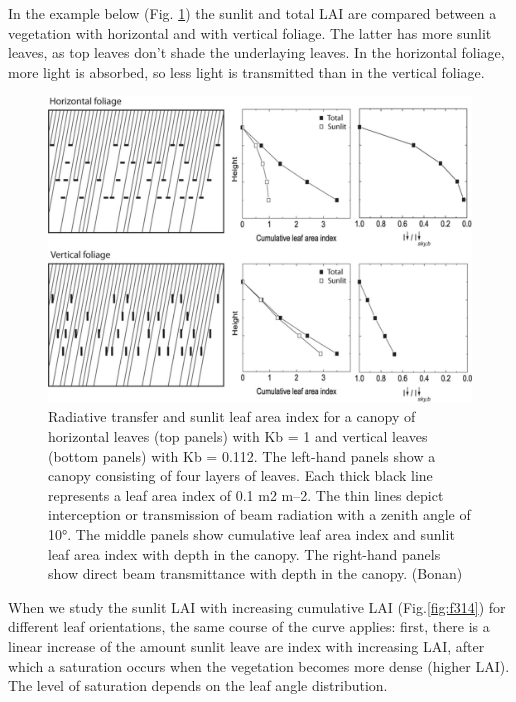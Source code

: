 \documentclass[
  12pt,
  oneside]{book}
\begin{document}
In the example below (Fig. \ref{fig:f313}) the sunlit and total LAI are compared between a vegetation with horizontal and with vertical foliage. The latter has more sunlit leaves, as top leaves don't shade the underlaying leaves. In the horizontal foliage, more light is absorbed, so less light is transmitted than in the vertical foliage.

\begin{figure}

{\centering \includegraphics[width=0.8\linewidth]{figures/chap3/f313_sun_shade} 

}

\caption{Radiative transfer and sunlit leaf area index for a canopy of horizontal leaves (top panels) with Kb = 1 and vertical leaves (bottom panels) with Kb = 0.112. The left-hand panels show a canopy consisting of four layers of leaves. Each thick black line represents a leaf area index of 0.1 m2 m–2. The thin lines depict interception or transmission of beam radiation with a zenith angle of 10°. The middle panels show cumulative leaf area index and sunlit leaf area index with depth in the canopy. The right-hand panels show direct beam transmittance with depth in the canopy. (Bonan)}\label{fig:f313}
\end{figure}

When we study the sunlit LAI with increasing cumulative LAI (Fig.\ref{fig:f314}) for different leaf orientations, the same course of the curve applies: first, there is a linear increase of the amount sunlit leave are index with increasing LAI, after which a saturation occurs when the vegetation becomes more dense (higher LAI). The level of saturation depends on the leaf angle distribution.
\end{document}
